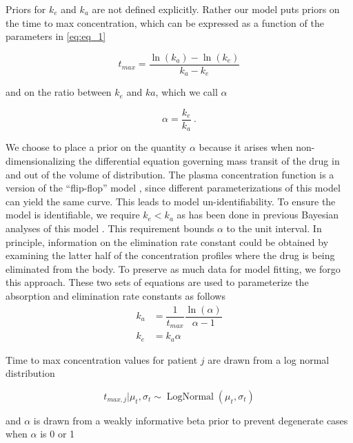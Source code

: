 Priors for $k_e$ and $k_a$ are not defined explicitly.  Rather our model puts priors on the time to max concentration, which can be expressed as a function of the parameters in \cref{eq:eq_1}

\begin{equation}\label{eq:eq_2}
 t_{max} = \dfrac{\ln(k_a) - \ln(k_e)}{k_a - k_e}
\end{equation}

\noindent and on the ratio between $k_e$ and $ka$, which we call $\alpha$

\begin{equation}\label{eq:eq_3}
\alpha  = \dfrac{k_e}{k_a} \>.
\end{equation}

\noindent We choose to place a prior on the quantity $\alpha$ because it arises when non-dimensionalizing \cite{Lin1988-pr} the differential equation governing mass transit of the drug in and out of the volume of distribution.  The plasma concentration function is a version of the “flip-flop” model \cite{Wakefield1996-yy, Salway2008-gi}, since different parameterizations of this model can yield the same curve.  This leads to model un-identifiability. To ensure the model is identifiable, we require $k_e<k_a$ as has been done in previous Bayesian analyses of this model \cite{Wakefield1996-yy, Salway2008-gi}. This requirement bounds $\alpha$ to the unit interval.  In principle, information on the elimination rate constant could be obtained by examining the latter half of the concentration profiles where the drug is being eliminated from the body. To preserve as much data for model fitting, we forgo this approach.  These two sets of equations are used to parameterize the absorption and elimination rate constants as follows
\begin{align}
	k_a &= \dfrac{1}{t_{max}} \dfrac{\ln(\alpha)}{\alpha-1} \label{eq:eq_4} \\
	k_e &= k_a \alpha \label{eq:eq_5}
\end{align}

Time to max concentration values for patient $j$ are drawn from a log normal distribution

\begin{equation}\label{eq:eq_6}
t_{max, j} \vert \mu_t, \sigma_t \sim \operatorname{LogNormal}(\mu_t, \sigma_t)
\end{equation}

\noindent and $\alpha$ is drawn from a weakly informative beta prior to prevent degenerate cases when $\alpha$  is 0 or 1

